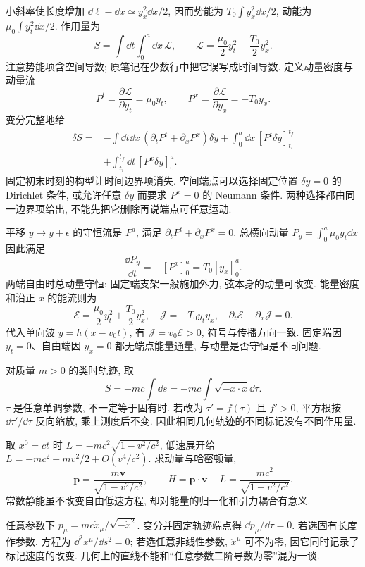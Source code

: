 小斜率使长度增加 $\dd\ell-\dd x\simeq y_x^2\dd x/2$, 因而势能为 $T_0\int y_x^2\dd x/2$, 动能为 $\mu_0\int y_t^2\dd x/2$. 作用量为
\[
 S=\int\dd t\int_0^a\dd x\,\mathcal L,
 \qquad\mathcal L=\frac{\mu_0}2y_t^2-\frac{T_0}2y_x^2.
\]
注意势能项含空间导数; 原笔记在少数行中把它误写成时间导数. 定义动量密度与动量流
\[
 P^t=\frac{\partial\mathcal L}{\partial y_t}=\mu_0y_t,\qquad
 P^x=\frac{\partial\mathcal L}{\partial y_x}=-T_0y_x.
\]
变分完整地给
\begin{align*}
 \delta S={}&-\int\dd t\dd x\,(\partial_tP^t+\partial_xP^x)\delta y
 +\int_0^a\dd x\,[P^t\delta y]_{t_i}^{t_f}\\
 &+\int_{t_i}^{t_f}\dd t\,[P^x\delta y]_{0}^{a}.
\end{align*}
固定初末时刻的构型让时间边界项消失. 空间端点可以选择固定位置 $\delta y=0$ 的 Dirichlet 条件, 或允许任意 $\delta y$ 而要求 $P^x=0$ 的 Neumann 条件. 两种选择都由同一边界项给出, 不能先把它删除再说端点可任意运动.

平移 $y\mapsto y+\epsilon$ 的守恒流是 $P^a$, 满足 $\partial_tP^t+\partial_xP^x=0$. 总横向动量 $P_y=\int_0^a\mu_0y_t\dd x$ 因此满足
\[
 \frac{\dd P_y}{\dd t}=-[P^x]_0^a=T_0[y_x]_0^a.
\]
两端自由时总动量守恒; 固定端支架一般施加外力, 弦本身的动量可改变. 能量密度和沿正 $x$ 的能流则为
\[
 \mathcal E=\frac{\mu_0}2y_t^2+\frac{T_0}2y_x^2,
 \quad\mathcal J=-T_0y_ty_x,
 \quad\partial_t\mathcal E+\partial_x\mathcal J=0.
\]
代入单向波 $y=h(x-v_0t)$, 有 $\mathcal J=v_0\mathcal E>0$, 符号与传播方向一致. 固定端因 $y_t=0$、自由端因 $y_x=0$ 都无端点能量通量, 与动量是否守恒是不同问题.

对质量 $m>0$ 的类时轨迹, 取
\[
 S=-mc\int\dd s=-mc\int\sqrt{-\dot x\cdot\dot x}\dd\tau.
\]
$\tau$ 是任意单调参数, 不一定等于固有时. 若改为 $\tau'=f(\tau)$ 且 $f'>0$, 平方根按 $\dd\tau'/\dd\tau$ 反向缩放, 乘上测度后不变. 因此相同几何轨迹的不同标记没有不同作用量.

取 $x^0=ct$ 时 $L=-mc^2\sqrt{1-v^2/c^2}$, 低速展开给 $L=-mc^2+mv^2/2+O(v^4/c^2)$. 求动量与哈密顿量,
\[
 \boldsymbol p=\frac{m\boldsymbol v}{\sqrt{1-v^2/c^2}},\qquad
 H=\boldsymbol p\cdot\boldsymbol v-L
 =\frac{mc^2}{\sqrt{1-v^2/c^2}}.
\]
常数静能虽不改变自由低速方程, 却对能量的归一化和引力耦合有意义.

任意参数下 $p_\mu=mc\dot x_\mu/\sqrt{-\dot x^2}$. 变分并固定轨迹端点得 $\dd p_\mu/\dd\tau=0$. 若选固有长度作参数, 方程为 $\dd^2x^\mu/\dd s^2=0$; 若选任意非线性参数, $\ddot x^\mu$ 可不为零, 因它同时记录了标记速度的改变. 几何上的直线不能和“任意参数二阶导数为零”混为一谈.

